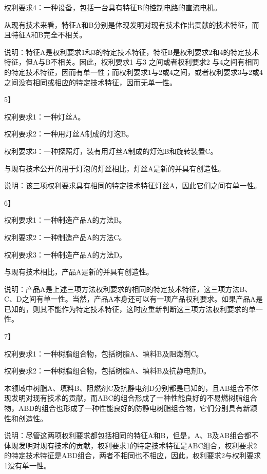 权利要求4：一种设备，包括一台具有特征B的控制电路的直流电机。

从现有技术来看，特征A和B分别是体现发明对现有技术作出贡献的技术特征，而且特征A和B完全不相关。

说明：特征A是权利要求1和3的特定技术特征，特征B是权利要求2和4的特定技术特征，但A与B不相关。因此，权利要求1 与3 之间或者权利要求2 与4之间有相同的特定技术特征，因而有单一性；而权利要求1与2或4之间，或者权利要求3与2或4之间没有相同或相应的特定技术特征，因而无单一性。

{5{\kaiti 】}\par}

权利要求1：一种灯丝A。

权利要求2：一种用灯丝A制成的灯泡B。

权利要求3：一种探照灯，装有用灯丝A制成的灯泡B和旋转装置C。

与现有技术公开的用于灯泡的灯丝相比，灯丝A是新的并具有创造性。

说明：该三项权利要求具有相同的特定技术特征灯丝A，因此它们之间有单一性。

{6{\kaiti 】}\par}

权利要求1：一种制造产品A的方法B。

权利要求2：一种制造产品A的方法C。

权利要求3：一种制造产品A的方法D。

与现有技术相比，产品A是新的并具有创造性。

说明：产品A是上述三项方法权利要求的相同的特定技术特征，这三项方法B、C、D之间有单一性。当然，产品A本身还可以有一项产品权利要求。如果产品A是已知的，则其不能作为特定技术特征，这时应重新判断这三项方法权利要求的单一性。

{7{\kaiti 】}\par}

权利要求1：一种树脂组合物，包括树脂A、填料B及阻燃剂C。

权利要求2：一种树脂组合物，包括树脂A、填料B及抗静电剂D。

本领域中树脂A、填料B、阻燃剂C及抗静电剂D分别都是已知的，且AB组合不体现发明对现有技术的贡献，而ABC的组合形成了一种性能良好的不易燃树脂组合物，ABD的组合也形成了一种性能良好的防静电树脂组合物，它们分别具有新颖性和创造性。

说明：尽管这两项权利要求都包括相同的特征A和B，但是，A、B及AB组合都不体现发明对现有技术的贡献，权利要求1的特定技术特征是ABC组合，权利要求2的特定技术特征是ABD组合，两者不相同也不相应，因此，权利要求2与权利要求1没有单一性。

